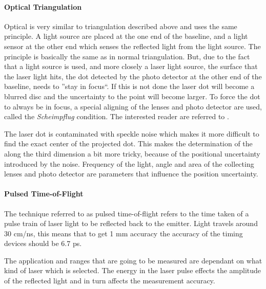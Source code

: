 \paragraph{Optical Triangulation}
Optical is very similar to triangulation described above and uses the same principle.
A light source are placed at the one end of the
baseline, and a light sensor at the other end which senses the reflected light from the
light source. The principle is basically the same as in normal triangulation. But, due to
the fact that a light source is used, and more closely a laser light source, the surface
that the laser light hits, the dot detected by the photo detector at the other end of the
baseline, needs to ''stay in focus``. If this is not done the laser dot will become a
blurred disc and the uncertainty to the point will become larger. To force the dot to
always be in focus, a special aligning of the lenses and photo detector are used, called 
the \emph{Scheimpflug} condition. The interested reader are referred to
\cite{laser-ranging-critical-review}.

The laser dot is contaminated with speckle noise which makes it more difficult to find the
exact center of the projected dot. This makes the determination of the along the third
dimension a bit more tricky, because of the positional uncertainty introduced by the
noise. Frequency of the light, angle and area of the collecting lenses and photo detector
are parameters that influence the position uncertainty. 


\paragraph{Pulsed Time-of-Flight}
The technique referred to as pulsed time-of-flight refers to the time taken of a pulse
train of laser light to be reflected back to the emitter. Light travels around 30 cm/ns,
this means that to get 1 mm accuracy the accuracy of the timing devices should be
6.7 ps.

The application and ranges that are going to be measured are dependant on what kind of
laser which is selected. The energy in the laser pulse effects the amplitude of the
reflected light and in turn affects the measurement accuracy.



